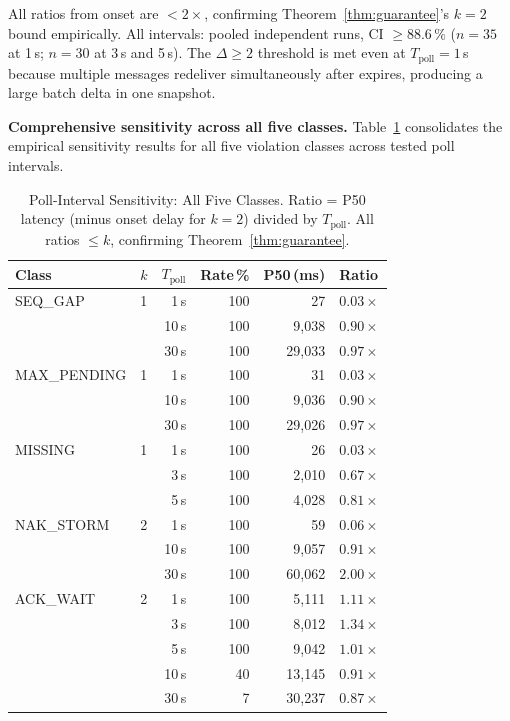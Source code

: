 \documentclass[journal]{IEEEtran}
\begin{document}
All ratios from onset are $<2\times$, confirming
Theorem~\ref{thm:guarantee}'s $k{=}2$ bound empirically.
All intervals: pooled independent runs, CI $\geq 88.6\,\%$
($n{=}35$ at 1\,s; $n{=}30$ at 3\,s and 5\,s).
The $\Delta$${}\geq 2$ threshold is met even at
$T_\text{poll}{=}1$\,s because multiple messages redeliver simultaneously
after  expires, producing a large batch delta in one
snapshot.

\textbf{Comprehensive sensitivity across all five classes.}
Table~\ref{tab:sens_full} consolidates the empirical sensitivity results
for all five violation classes across tested poll intervals.

\begin{table}[t]
\centering
\caption{Poll-Interval Sensitivity: All Five Classes. Ratio = P50 latency
  (minus onset delay for $k{=}2$) divided by $T_\text{poll}$.
  All ratios $\leq k$, confirming Theorem~\ref{thm:guarantee}.}
\label{tab:sens_full}
\small\begin{tabular}{llrrrl}
\toprule
Class & $k$ & $T_\text{poll}$ & Rate\,\% & P50\,(ms) & Ratio \\
\midrule
SEQ\_GAP     & 1 & 1\,s  & 100 &     27 & $0.03\times$ \\
             &   & 10\,s & 100 &  9,038 & $0.90\times$ \\
             &   & 30\,s & 100 & 29,033 & $0.97\times$ \\
\midrule
MAX\_PENDING & 1 & 1\,s  & 100 &     31 & $0.03\times$ \\
             &   & 10\,s & 100 &  9,036 & $0.90\times$ \\
             &   & 30\,s & 100 & 29,026 & $0.97\times$ \\
\midrule
MISSING      & 1 & 1\,s  & 100 &     26 & $0.03\times$ \\
             &   & 3\,s  & 100 &  2,010 & $0.67\times$ \\
             &   & 5\,s  & 100 &  4,028 & $0.81\times$ \\
\midrule
NAK\_STORM   & 2 & 1\,s  & 100 &     59 & $0.06\times$ \\
             &   & 10\,s & 100 &  9,057 & $0.91\times$ \\
             &   & 30\,s & 100 & 60,062 & $2.00\times$ \\
\midrule
ACK\_WAIT    & 2 & 1\,s  & 100 &  5,111 & $1.11\times$ \\
             &   & 3\,s  & 100 &  8,012 & $1.34\times$ \\
             &   & 5\,s  & 100 &  9,042 & $1.01\times$ \\
             &   & 10\,s &  40 & 13,145 & $0.91\times$ \\
             &   & 30\,s &   7 & 30,237 & $0.87\times$ \\
\bottomrule
\end{tabular}
\end{table}
\end{document}
